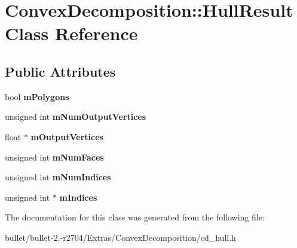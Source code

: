 \hypertarget{class_convex_decomposition_1_1_hull_result}{\section{Convex\+Decomposition\+:\+:Hull\+Result Class Reference}
\label{class_convex_decomposition_1_1_hull_result}
}
\subsection*{Public Attributes}
\begin{DoxyCompactItemize}
\item 
\hypertarget{class_convex_decomposition_1_1_hull_result_a2055c2e30fb30d2ceb514731337caaf9}{bool {\bfseries m\+Polygons}}\label{class_convex_decomposition_1_1_hull_result_a2055c2e30fb30d2ceb514731337caaf9}

\item 
\hypertarget{class_convex_decomposition_1_1_hull_result_a0d2ec073c9cac2eec0e9cfe40eabccf6}{unsigned int {\bfseries m\+Num\+Output\+Vertices}}\label{class_convex_decomposition_1_1_hull_result_a0d2ec073c9cac2eec0e9cfe40eabccf6}

\item 
\hypertarget{class_convex_decomposition_1_1_hull_result_ae37d58f8a9101ca7eef405a163a0d94f}{float $\ast$ {\bfseries m\+Output\+Vertices}}\label{class_convex_decomposition_1_1_hull_result_ae37d58f8a9101ca7eef405a163a0d94f}

\item 
\hypertarget{class_convex_decomposition_1_1_hull_result_a5aab42241723424304e405d94ffd80ff}{unsigned int {\bfseries m\+Num\+Faces}}\label{class_convex_decomposition_1_1_hull_result_a5aab42241723424304e405d94ffd80ff}

\item 
\hypertarget{class_convex_decomposition_1_1_hull_result_a81efc2975736e1f31f7e6e47060ed323}{unsigned int {\bfseries m\+Num\+Indices}}\label{class_convex_decomposition_1_1_hull_result_a81efc2975736e1f31f7e6e47060ed323}

\item 
\hypertarget{class_convex_decomposition_1_1_hull_result_a6646fd3bdc0dea86c630e9d8f7120d1c}{unsigned int $\ast$ {\bfseries m\+Indices}}\label{class_convex_decomposition_1_1_hull_result_a6646fd3bdc0dea86c630e9d8f7120d1c}

\end{DoxyCompactItemize}


The documentation for this class was generated from the following file\+:\begin{DoxyCompactItemize}
\item 
bullet/bullet-\/2.-\/r2704/\+Extras/\+Convex\+Decomposition/cd\+\_\+hull.\+h\end{DoxyCompactItemize}
